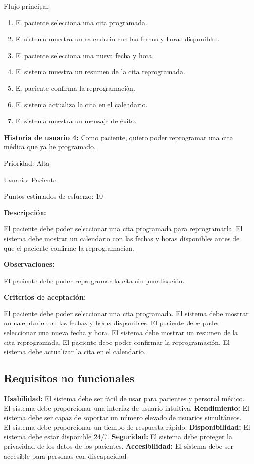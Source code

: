 \documentclass{article}
\theoremstyle{mytheoremstyle}
\theoremstyle{mytheoremstyle}
\theoremstyle{myproblemstyle}
\begin{document}
Flujo principal:
\begin{enumerate} 
    \item El paciente selecciona una cita programada.
    \item El sistema muestra un calendario con las fechas y horas disponibles.
    \item El paciente selecciona una nueva fecha y hora.
    \item El sistema muestra un resumen de la cita reprogramada.
    \item El paciente confirma la reprogramación.
    \item El sistema actualiza la cita en el calendario.
    \item El sistema muestra un mensaje de éxito.
    \end{enumerate}  

\textbf{Historia de usuario 4:}  
Como paciente, quiero poder reprogramar una cita médica que ya he programado.

Prioridad: Alta

Usuario: Paciente

Puntos estimados de esfuerzo: 10

\textbf{Descripción:} 

El paciente debe poder seleccionar una cita programada para reprogramarla. El sistema debe mostrar un calendario con las fechas y horas disponibles antes de que el paciente confirme la reprogramación.

\textbf{Observaciones:} 

El paciente debe poder reprogramar la cita sin penalización.

\textbf{Criterios de aceptación:} 

El paciente debe poder seleccionar una cita programada.
El sistema debe mostrar un calendario con las fechas y horas disponibles.
El paciente debe poder seleccionar una nueva fecha y hora.
El sistema debe mostrar un resumen de la cita reprogramada.
El paciente debe poder confirmar la reprogramación.
El sistema debe actualizar la cita en el calendario.

\subsection{Requisitos no funcionales}
\textbf{Usabilidad:}
El sistema debe ser fácil de usar para pacientes y personal médico.
El sistema debe proporcionar una interfaz de usuario intuitiva.
\newline \textbf{Rendimiento:}
El sistema debe ser capaz de soportar un número elevado de usuarios simultáneos.
El sistema debe proporcionar un tiempo de respuesta rápido.
\newline \textbf{Disponibilidad:}
El sistema debe estar disponible 24/7.
\newline \textbf{Seguridad:}
El sistema debe proteger la privacidad de los datos de los pacientes.
\newline \textbf{Accesibilidad:}
El sistema debe ser accesible para personas con discapacidad.
\end{document}
